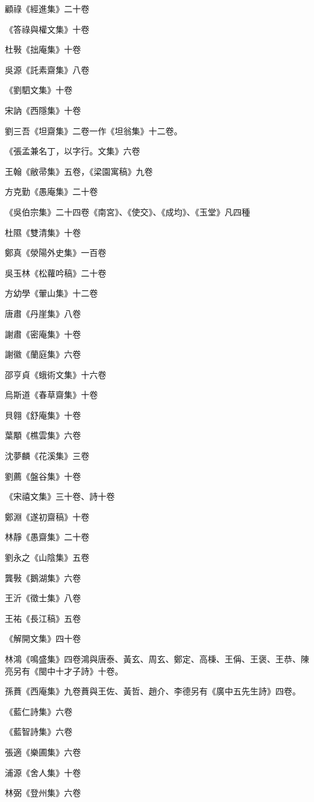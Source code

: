顧祿《經進集》二十卷

《答祿與權文集》十卷

杜斅《拙庵集》十卷

吳源《託素齋集》八卷

《劉駟文集》十卷

宋訥《西隱集》十卷

劉三吾《坦齋集》二卷一作《坦翁集》十二卷。

《張孟兼名丁，以字行。文集》六卷

王翰《敝帚集》五卷，《梁園寓稿》九卷

方克勤《愚庵集》二十卷

《吳伯宗集》二十四卷《南宮》、《使交》、《成均》、《玉堂》凡四種

杜隰《雙清集》十卷

鄭真《滎陽外史集》一百卷

吳玉林《松蘿吟稿》二十卷

方幼學《翬山集》十二卷

唐肅《丹崖集》八卷

謝肅《密庵集》十卷

謝徽《蘭庭集》六卷

邵亨貞《蛾術文集》十六卷

烏斯道《春草齋集》十卷

貝翱《舒庵集》十卷

葉顒《樵雲集》六卷

沈夢麟《花溪集》三卷

劉薦《盤谷集》十卷

《宋禧文集》三十卷、詩十卷

鄭淵《遂初齋稿》十卷

林靜《愚齋集》二十卷

劉永之《山陰集》五卷

龔斅《鵝湖集》六卷

王沂《徵士集》八卷

王祐《長江稿》五卷

《解開文集》四十卷

林鴻《鳴盛集》四卷鴻與唐泰、黃玄、周玄、鄭定、高棅、王偁、王褒、王恭、陳亮另有《閩中十才子詩》十卷。

孫蕡《西庵集》九卷蕡與王佐、黃哲、趙介、李德另有《廣中五先生詩》四卷。

《藍仁詩集》六卷

《藍智詩集》六卷

張適《樂圃集》六卷

浦源《舍人集》十卷

林弼《登州集》六卷

